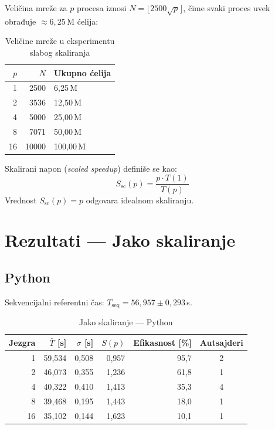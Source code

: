 \documentclass[12pt,a4paper]{article}
\begin{document}
Veličina mreže za $p$ procesa iznosi $N = \lfloor 2500\sqrt{p} \rfloor$, čime svaki
proces uvek obrađuje $\approx 6{,}25\,\mathrm{M}$ ćelija:

\begin{table}[H]
    \centering
    \caption{Veličine mreže u eksperimentu slabog skaliranja}
    \begin{tabular}{rrl}
        \toprule
        $p$ & $N$ & Ukupno ćelija \\
        \midrule
        1  & 2500  & 6{,}25\,M \\
        2  & 3536  & 12{,}50\,M \\
        4  & 5000  & 25{,}00\,M \\
        8  & 7071  & 50{,}00\,M \\
        16 & 10000 & 100{,}00\,M \\
        \bottomrule
    \end{tabular}
\end{table}

Skalirani napon (\emph{scaled speedup}) definiše se kao:
\begin{equation}
    S_{\mathrm{sc}}(p) = \frac{p \cdot T(1)}{T(p)}
\end{equation}
Vrednost $S_{\mathrm{sc}}(p) = p$ odgovara idealnom skaliranju.

\section{Rezultati --- Jako skaliranje}

\subsection{Python}

Sekvencijalni referentni čas: $T_{\mathrm{seq}} = 56{,}957 \pm 0{,}293$\,s.

\begin{table}[H]
    \centering
    \caption{Jako skaliranje --- Python}
    \begin{tabular}{rrrrrc}
        \toprule
        Jezgra & $\bar{T}$ [s] & $\sigma$ [s] & $S(p)$ & Efikasnost [\%] & Autsajderi \\
        \midrule
        1  & 59{,}534 & 0{,}508 & 0{,}957 & 95{,}7 & 2 \\
        2  & 46{,}073 & 0{,}355 & 1{,}236 & 61{,}8 & 1 \\
        4  & 40{,}322 & 0{,}410 & 1{,}413 & 35{,}3 & 4 \\
        8  & 39{,}468 & 0{,}195 & 1{,}443 & 18{,}0 & 1 \\
        16 & 35{,}102 & 0{,}144 & 1{,}623 & 10{,}1 & 1 \\
        \bottomrule
    \end{tabular}
\end{table}
\end{document}
